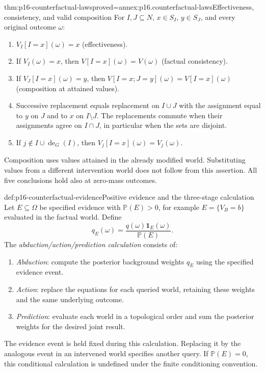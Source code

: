 \begin{hbtheorem}{thm:p16-counterfactual-laws}{proved=annex:p16.counterfactual-laws}{Effectiveness, consistency, and valid composition}
For \(I,J\subseteq N\), \(x\in S_I\), \(y\in S_J\), and
every original outcome \(\omega\):
\begin{enumerate}
\item \(V_I[I=x](\omega)=x\) (effectiveness).
\item If \(V_I(\omega)=x\), then
      \(V[I=x](\omega)=V(\omega)\) (factual consistency).
\item If \(V_J[I=x](\omega)=y\), then
      \(V[I=x;J=y](\omega)=V[I=x](\omega)\)
      (composition at attained values).
\item Successive replacement equals replacement on \(I\cup J\)
      with the assignment equal to \(y\) on \(J\) and to \(x\)
      on \(I\setminus J\). The replacements commute when their
      assignments agree on \(I\cap J\), in particular when the
      sets are disjoint.
\item If \(j\notin I\cup\operatorname{de}_G(I)\), then
      \(V_j[I=x](\omega)=V_j(\omega)\).
\end{enumerate}
Composition uses values attained in the already modified world.
Substituting values from a different intervention world does not follow
from this assertion. All five conclusions hold also at zero-mass outcomes.
\end{hbtheorem}

\begin{hbdefinition}{def:p16-counterfactual-evidence}{Positive evidence and the three-stage calculation}
Let \(E\subseteq\Omega\) be specified evidence with
\(\mathbb P(E)>0\), for example \(E=\{V_B=b\}\) evaluated
in the factual world. Define
\[
 q_E(\omega)=\frac{q(\omega)\mathbf1_E(\omega)}{\mathbb P(E)}.
\]
The \emph{abduction/action/prediction calculation} consists of:
\begin{enumerate}
\item \emph{Abduction}: compute the posterior background weights
      \(q_E\) using the specified evidence event.
\item \emph{Action}: replace the equations for each queried world,
      retaining these weights and the same underlying outcome.
\item \emph{Prediction}: evaluate each world in a topological order
      and sum the posterior weights for the desired joint result.
\end{enumerate}
The evidence event is held fixed during this calculation. Replacing
it by the analogous event in an intervened world specifies another
query. If \(\mathbb P(E)=0\), this conditional calculation is
undefined under the finite conditioning convention.
\end{hbdefinition}

